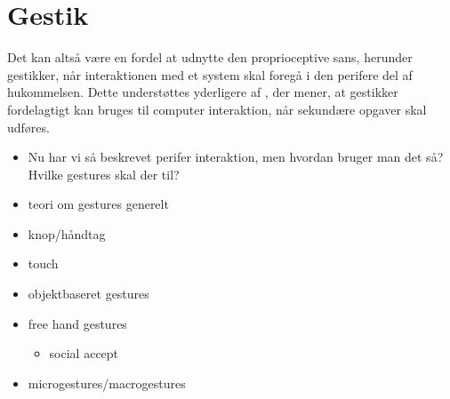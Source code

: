 \section{Gestik}
\label{Gestik}
%
Det kan altså være en fordel at udnytte den proprioceptive sans, herunder gestikker, når interaktionen med et system skal foregå i den perifere del af hukommelsen. Dette understøttes yderligere af \textcite[s. 1961]{PDF:AStudyOnTheUseOfSemaphoricGestures}, der mener, at gestikker fordelagtigt kan bruges til computer interaktion, når sekundære opgaver skal udføres. 


\begin{itemize}
	\item Nu har vi så beskrevet perifer interaktion, men hvordan bruger man det så? Hvilke gestures skal der til?
	\item teori om gestures generelt
	\item knop/håndtag
	\item touch
	\item objektbaseret gestures
	\item free hand gestures
	\begin{itemize}
		\item social accept
	\end{itemize}
	\item microgestures/macrogestures
\end{itemize}
